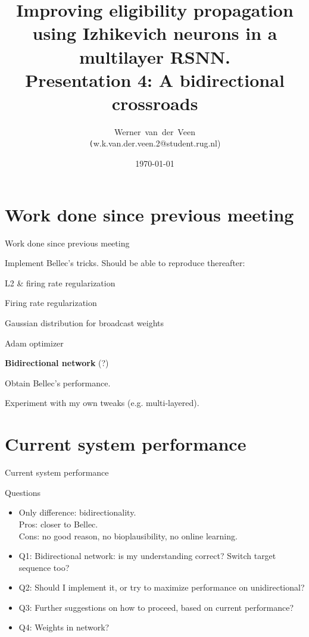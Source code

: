\documentclass[t]{beamer}
\title[Eligibility propagation]{Improving eligibility propagation using Izhikevich neurons in a multilayer RSNN.\\\vspace{10pt}
\large{Presentation 4: A bidirectional crossroads}}
\author[Werner]{Werner~van~der~Veen\\\tiny\texttt({w.k.van.der.veen.2@student.rug.nl})}\date{\today}
\newcommand{\cmark}{\ding{51}}%
\newcommand{\done}{\rlap{$\square$}{\raisebox{2pt}{\large\hspace{1pt}\cmark}}%
\hspace{-2.5pt}}
\begin{document}
\begin{frame}
    \titlepage
\end{frame}



\small
\section{Work done since previous meeting}
\begin{frame}{Work done since previous meeting}
	\begin{todolist}

    \item[\done] Implement Bellec's tricks. Should be able to reproduce thereafter:
    \begin{todolist}
    	\item[\done] L2 \& firing rate regularization
    	\item[\done] Firing rate regularization
    	\item[\done] Gaussian distribution for broadcast weights
    	\item[\done] Adam optimizer
    \end{todolist}
    \item \textbf{Bidirectional network} (?)
    \item Obtain Bellec's performance.
    \item Experiment with my own tweaks (e.g. multi-layered).
  \end{todolist}
\end{frame}

\section{Current system performance}
\begin{frame}{Current system performance}

\end{frame}


\begin{frame}{Questions}
	\begin{itemize}[label=--]
	\item Only difference: bidirectionality.\\Pros: closer to Bellec.\\Cons: no good reason, no bioplausibility, no online learning.\\
	\item Q1: Bidirectional network: is my understanding correct? Switch target sequence too?
	\item Q2: Should I implement it, or try to maximize performance on unidirectional?
	\item Q3: Further suggestions on how to proceed, based on current performance?
	\item Q4: Weights in network?
	\end{itemize}
\end{frame}
\end{document}
